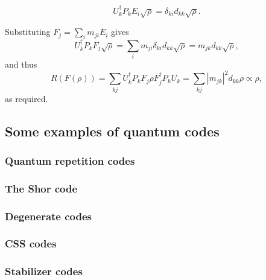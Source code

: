 \documentclass{article}
\begin{document}
\begin{equation}
	U_k^\dagger P_k E_i \sqrt{\rho} = \delta_{ki} d_{kk} \sqrt{\rho}.
\end{equation}

Substituting $F_j = \sum_i m_{ji} E_i$ gives
\begin{equation}
	U_k^\dagger P_k F_j \sqrt{\rho} = \sum_i m_{ji} \delta_{ki} d_{kk} \sqrt{\rho} = m_{jk} d_{kk} \sqrt{\rho},
\end{equation}
and thus
\begin{equation}
	R(F(\rho)) = \sum_{kj} U_k^\dagger P_k F_j \rho F_j^\dagger P_k U_k = \sum_{kj} |m_{jk}|^2 d_{kk} \rho \propto \rho,
\end{equation}
as required.


\subsection{Some examples of quantum codes}

\subsubsection{Quantum repetition codes}

\subsubsection{The Shor code}

\subsubsection{Degenerate codes}

\subsubsection{CSS codes}

\subsubsection{Stabilizer codes}
\end{document}
